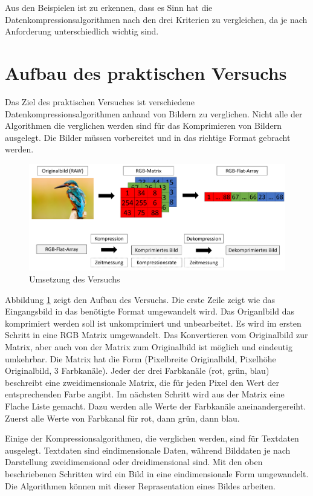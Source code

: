 \documentclass[conference]{IEEEtran}
\begin{document}
Aus den Beispielen ist zu erkennen, dass es Sinn hat die
Datenkompressionsalgorithmen nach den drei Kriterien zu vergleichen,
da je nach Anforderung unterschiedlich wichtig sind.


\section{Aufbau des praktischen Versuchs}

Das Ziel des praktischen Versuches ist verschiedene Datenkompressionsalgorithmen
anhand von Bildern zu verglichen.
Nicht alle der Algorithmen die verglichen werden sind für das Komprimieren von
Bildern ausgelegt.
Die Bilder müssen vorbereitet und in das richtige Format gebracht werden.

\begin{figure}[h]
  \centering
  \includegraphics[width=\columnwidth]{./images/Idea.png}
  \caption{Umsetzung des Versuchs}
  \label{fig:idea}
\end{figure}

Abbildung \ref{fig:idea} zeigt den Aufbau des Versuchs.
Die erste Zeile zeigt wie das Eingangsbild in das benötigte Format umgewandelt
wird.
Das Origanlbild das komprimiert werden soll ist unkomprimiert und unbearbeitet.
Es wird im ersten Schritt in eine RGB Matrix umgewandelt.
Das Konvertieren vom Originalbild zur Matrix, aber auch von der Matrix
zum Originalbild ist möglich und eindeutig umkehrbar.
Die Matrix hat die Form (Pixelbreite Originalbild, Pixelhöhe Originalbild,
3 Farbkanäle).
Jeder der drei Farbkanäle (rot, grün, blau) beschreibt eine zweidimensionale Matrix,
die für jeden Pixel den Wert der entsprechenden Farbe angibt.
Im nächsten Schritt wird aus der Matrix eine Flache Liste gemacht.
Dazu werden alle Werte der Farbkanäle aneinandergereiht.
Zuerst alle Werte von Farbkanal für rot, dann grün, dann blau.

Einige der Kompressionsalgorithmen, die verglichen werden, sind für Textdaten ausgelegt.
Textdaten sind eindimensionale Daten, während Bilddaten je nach Darstellung
zweidimensional oder dreidimensional sind.
Mit den oben beschriebenen Schritten wird ein Bild in eine eindimensionale
Form umgewandelt.
Die Algorithmen können mit dieser Reprasentation eines Bildes arbeiten.
\end{document}
